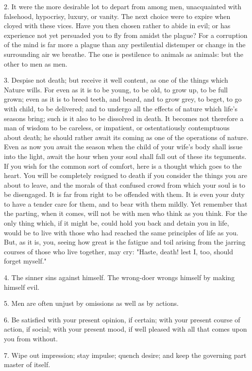 \documentclass{book}
\begin{document}
2. It were the more desirable lot to depart from among men,
unacquainted with falsehood, hypocrisy, luxury, or vanity. The next
choice were to expire when cloyed with these vices. Have you then
chosen rather to abide in evil; or has experience not yet persuaded
you to fly from amidst the plague? For a corruption of the mind is far
more a plague than any pestilential distemper or change in the
surrounding air we breathe. The one is pestilence to animals as
animals: but the other to men as men.

3. Despise not death; but receive it well content, as one of the
things which Nature wills. For even as it is to be young, to be old,
to grow up, to be full grown; even as it is to breed teeth, and beard,
and to grow grey, to beget, to go with child, to be delivered; and to
undergo all the effects of nature which life's seasons bring; such is
it also to be dissolved in death. It becomes not therefore a man of
wisdom to be careless, or impatient, or ostentatiously contemptuous
about death; he should rather await its coming as one of the
operations of nature. Even as now you await the season when the child
of your wife's body shall issue into the light, await the hour when
your soul shall fall out of these its teguments. If you wish for the
common sort of comfort, here is a thought which goes to the heart. You
will be completely resigned to death if you consider the things you
are about to leave, and the morals of that confused crowd from which
your soul is to be disengaged. It is far from right to be offended
with them. It is even your duty to have a tender care for them, and to
bear with them mildly. Yet remember that the parting, when it comes,
will not be with men who think as you think. For the only thing which,
if it might be, could hold you back and detain you in life, would be
to live with those who had reached the same principles of life as
you. But, as it is, you, seeing how great is the fatigue and toil
arising from the jarring courses of those who live together, may cry:
"Haste, death!  lest I, too, should forget myself."

4. The sinner sins against himself. The wrong-doer wrongs himself by
making himself evil.

5. Men are often unjust by omissions as well as by actions.

6. Be satisfied with your present opinion, if certain; with your
present course of action, if social; with your present mood, if well
pleased with all that comes upon you from without.

7. Wipe out impression; stay impulse; quench desire; and keep the
governing part master of itself.
\end{document}
